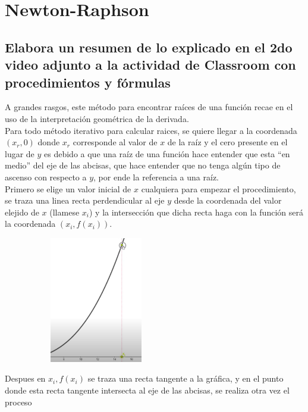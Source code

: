 \documentclass[letterpaper, 12pt]{article}
\begin{document}
\thispagestyle{fancy}
\section*{Newton-Raphson}
\subsection*{Elabora un resumen de lo explicado en el 2do video adjunto a la actividad de Classroom con procedimientos y fórmulas}
\justify
A grandes rasgos, este método para encontrar raíces de una función recae en el uso de la interpretación geométrica de la derivada. 
\\\newline
Para todo método iterativo para calcular raices, se quiere llegar a la coordenada \((x_r,0)\) donde \(x_r\) corresponde al valor de 
\(x\) de la raíz y el cero presente en el lugar de \(y\) es debido a que una raíz de una función hace entender que
esta ``en medio'' del eje de las abcisas, que hace entender que no tenga algún tipo de ascenso con respecto a \(y\), por ende la referencia a una raíz.
\\\newline
Primero se elige un valor inicial de \(x\) cualquiera para empezar el procedimiento, se traza una linea recta perdendicular al eje \(y\) desde la
coordenada del valor elejido de \(x\) (llamese \(x_i\)) y la intersección que dicha recta haga con la función será la coordenada \((x_i,f(x_i))\).
\begin{figure}[H]
    \centering
    \includegraphics[height=5.5cm,width=6cm]{primero.PNG}
\end{figure}
\justify
Despues en \(x_i,f(x_i)\) se traza una recta tangente a la gráfica, y en el punto donde esta recta tangente intersecta al eje de las abcisas, se realiza otra vez el proceso
\end{document}
